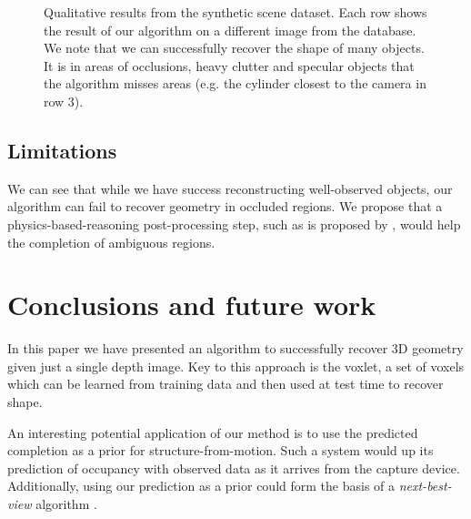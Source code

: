\documentclass[10pt,twocolumn,letterpaper]{article}
\makeatletter
\renewcommand*{\eg}{e.g.\@\xspace}
\makeatother
\begin{document}

\newcommand{\turnheight}{0.36\columnwidth}
\begin{figure}
    
    \vspace{5pt}
     \caption{
     Qualitative results from the synthetic scene dataset. Each row shows the result of our algorithm on a different image from the database.
     We note that we can successfully recover the shape of many objects.
     It is in areas of occlusions, heavy clutter and specular objects that the algorithm misses areas (\eg the cylinder closest to the camera in row 3).
     \label{fig:osd_qual}
     }
\end{figure}

\subsection{Limitations}
We can see that while we have success reconstructing well-observed objects, our algorithm can fail to recover geometry in occluded regions.
We propose that a physics-based-reasoning post-processing step, such as is proposed by \cite{zheng-cvpr-2013, shao-siggraphasia-2014}, would help the completion of ambiguous regions.


\section{Conclusions and future work}

In this paper we have presented an algorithm to successfully recover 3D geometry given just a single depth image.
Key to this approach is the voxlet, a set of voxels which can be learned from training data and then used at test time to recover shape.

An interesting potential application of our method is to use the predicted completion as a prior for structure-from-motion.
Such a system would up its prediction of occupancy with observed data as it arrives from the capture device.
Additionally, using our prediction as a prior could form the basis of a \emph{next-best-view} algorithm \cite{Potthast2014148}.





\pagebreak
{\small


}
\end{document}
